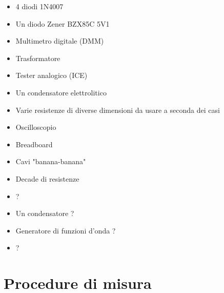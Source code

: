 \documentclass{article}
\begin{document}
\begin{itemize}
  \item 4 diodi 1N4007
  \item Un diodo Zener BZX85C 5V1 
  \item Multimetro digitale (DMM)
  \item Trasformatore
  \item Tester analogico (ICE)
  \item Un condensatore elettrolitico
  \item Varie resistenze di diverse dimensioni da usare a seconda dei casi
  \item Oscilloscopio
  \item Breadboard
  \item Cavi "banana-banana"
  \item Decade di resistenze
  \item ?
  \item Un condensatore ?
  \item Generatore di funzioni d'onda ?
  \item ? 
\end{itemize}

\newpage

\section{Procedure di misura}
\end{document}
